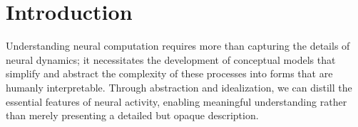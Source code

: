 \documentclass{article}
\theoremstyle{definition} \newtheorem{definition}{Definition}  \newtheorem{example}{Example}
\theoremstyle{remark} \newtheorem{remark}{Remark}
\newcounter{ct}
\begin{document}
\begin{abstract}
\end{abstract}

\section{Introduction}\label{sec:intro}
Understanding neural computation requires more than capturing the details of neural dynamics; it necessitates the development of conceptual models that simplify and abstract the complexity of these processes into forms that are humanly interpretable.
Through abstraction and idealization, we can distill the essential features of neural activity, enabling meaningful understanding rather than merely presenting a detailed but opaque description.

 
\end{document}
